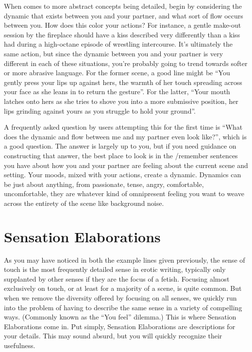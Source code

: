 \documentclass[Source-main.tex]{subfiles}
\begin{document}
When comes to more abstract concepts being detailed, begin by considering the dynamic that exists between you and your partner, and what sort of flow occurs between you.
How does this color your actions? For instance, a gentle make-out session by the fireplace should have a kiss described very differently than a kiss had during a high-octane episode of wrestling intercourse.
It’s ultimately the same action, but since the dynamic between you and your partner is very different in each of these situations, you’re probably going to trend towards softer or more abrasive language.
For the former scene, a good line might be “You gently press your lips up against hers, the warmth of her touch spreading across your face as she leans in to return the gesture”.
For the latter, “Your mouth latches onto hers as she tries to shove you into a more submissive position, her lips grinding against yours as you struggle to hold your ground”.

A frequently asked question by users attempting this for the first time is “What does the dynamic and flow between me and my partner even look like?”, which is a good question.
The answer is largely up to you, but if you need guidance on constructing that answer, the best place to look is in the /remember sentences you have about how you and your partner are feeling about the current scene and setting.
Your moods, mixed with your actions, create a dynamic.
Dynamics can be just about anything, from passionate, tense, angry, comfortable, uncomfortable, they are whatever kind of omnipresent feeling you want to weave across the entirety of the scene like background noise.

\section{Sensation Elaborations}

As you may have noticed in both the example lines given previously, the sense of touch is the most frequently detailed sense in erotic writing, typically only supplanted by other senses if they are the focus of a fetish.
Focusing almost exclusively on touch, or at least for a majority of a scene, is quite common.
But when we remove the diversity offered by focusing on all senses, we quickly run into the problem of having to describe the same sense in a variety of compelling ways.
(Commonly known as the “You feel” dilemma.)
This is where Sensation Elaborations come in.
Put simply, Sensation Elaborations are descriptions for your details.
This may sound absurd, but you will quickly recognize their usefulness.
\end{document}
